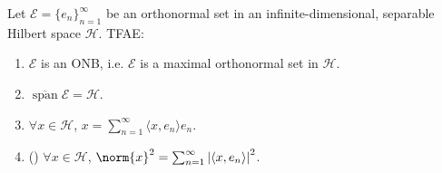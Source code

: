 \documentclass[notoc,notitlepage]{tufte-book}
\DeclareMathOperator{\Span}{span}
\begin{document}
\begin{thm}\label{thm:characterization_of_an_onb}
  Let $\mathcal{E} = \{ e_n \}_{n=1}^{\infty}$ be an orthonormal set
  in an infinite-dimensional, separable Hilbert space $\mathcal{H}$. TFAE:
  \begin{enumerate}
    \item $\mathcal{E}$ is an ONB, i.e. $\mathcal{E}$ is a maximal
      orthonormal set in $\mathcal{H}$.
    \item $\overline{\Span} \mathcal{E} = \mathcal{H}$.
    \item $\forall x \in \mathcal{H}$, $x = \sum_{n=1}^{\infty} \langle x, e_n
      \rangle e_n$.
    \item () $\forall x \in \mathcal{H}$,
      $\norm{x}^2 = \sum_{n=1}^{\infty} \abs{\langle x, e_n \rangle}^2$.
  \end{enumerate}
\end{thm}
\end{document}
